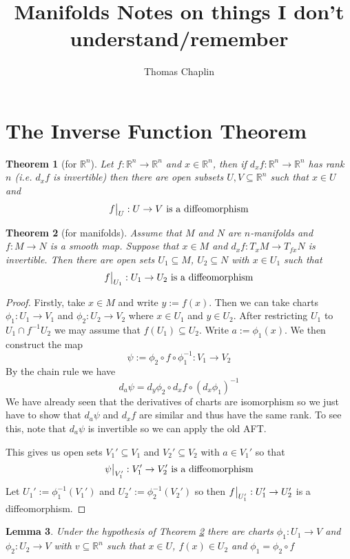 \documentclass[11pt]{article}
\title{Manifolds Notes on things I don't understand/remember}
\author{Thomas Chaplin}
\date{}
\newcommand{\defeq}{:=}
\newcommand\restr[2]{{%
  \left.\kern-\nulldelimiterspace %
  #1 %
  \vphantom{\big|} %
  \right|_{#2} %
  }}
\newcommand{\R}{\mathbb{R}}
\newtheorem{theorem}{Theorem}[section]
\newtheorem{lemma}[theorem]{Lemma}
\begin{document}
\maketitle
\tableofcontents
\newpage

\section{The Inverse Function Theorem}

\begin{theorem}[for $\R^n$]
Let $f:\R^n \to \R^n$ and $x\in \R^n$, then if $d_xf:\R^n \to \R^n$ has rank $n$ (i.e. $d_xf$ is invertible) then there are open subsets $U, V \subseteq \R^n$ such that $x\in U$ and
\[
	\restr{f}{U}: U \to V \text{ is a diffeomorphism}
\]
\end{theorem}

\begin{theorem}[for manifolds]
Assume that $M$ and $N$ are $n$-manifolds and $f:M \to N$ is a smooth map.
Suppose that $x\in M$ and $d_xf:T_xM \to T_{fx}N$ is invertible.
Then there are open sets $U_1\subseteq M$, $U_2\subseteq N$ with $x\in U_1$ such that
\[
	\restr{f}{U_1}:U_1 \to U_2 \text{ is a diffeomorphism}
\]
\label{th:iftmani}
\end{theorem}

\begin{proof}
Firstly, take $x\in M$ and write $y\defeq f(x)$.
Then we can take charts $\phi_1: U_1 \to V_1$ and $\phi_2: U_2 \to V_2$ where $x\in U_1$ and $y\in U_2$.
After restricting $U_1$ to $U_1\cap f^{-1}U_2$ we may assume that $f(U_1) \subseteq U_2$.
Write $a\defeq \phi_1(x)$.
We then construct the map
\[
	\psi \defeq \phi_2 \circ f \circ \phi_1^{-1}: V_1 \to V_2
\]
By the chain rule we have
\[
	d_a\psi = d_y\phi_2 \circ d_x f \circ (d_x\phi_1)^{-1}
\]
We have already seen that the derivatives of charts are isomorphism so we just have to show that $d_a\psi$ and $d_x f$ are similar and thus have the same rank.
To see this, note that $d_a\psi$ is invertible so we can apply the old AFT.

This gives us open sets $V_1' \subseteq V_1$ and $V_2' \subseteq V_2$ with $a\in V_1'$ so that
\[
	\restr{\psi}{V_1'}:V_1' \to V_2' \text{ is a diffeomorphism}
\]
Let $U_1'\defeq \phi_1^{-1}(V_1')$ and $U_2'\defeq \phi_2^{-1}(V_2')$ so then $\restr{f}{U_1'}:U_1'\to U_2'$ is a diffeomorphism.
\end{proof}

\begin{lemma}
\label{le:f2id}
Under the hypothesis of Theorem \ref{th:iftmani} there are charts $\phi_1: U_1 \to V$ and $\phi_2: U_2 \to V$ with $v\subseteq \R^n$ such that $x\in U$, $f(x)\in U_2$ and $\phi_1 = \phi_2 \circ f$
\end{lemma}
\end{document}
